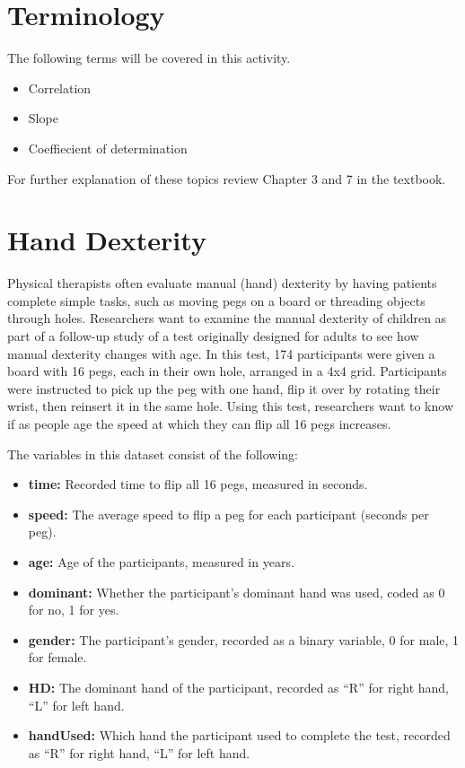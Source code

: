 \documentclass[
]{report}
\begin{document}
\hypertarget{terminology}{%
\section{Terminology}\label{terminology}}

The following terms will be covered in this activity.

\begin{itemize}
\item
  Correlation
\item
  Slope
\item
  Coeffiecient of determination
\end{itemize}

For further explanation of these topics review Chapter 3 and 7 in the textbook.

\hypertarget{hand-dexterity}{%
\section{Hand Dexterity}\label{hand-dexterity}}

Physical therapists often evaluate manual (hand) dexterity by having patients complete simple tasks, such as moving pegs on a board or threading objects through holes. Researchers want to examine the manual dexterity of children as part of a follow-up study of a test originally designed for adults to see how manual dexterity changes with age. In this test, 174 participants were given a board with 16 pegs, each in their own hole, arranged in a 4x4 grid. Participants were instructed to pick up the peg with one hand, flip it over by rotating their wrist, then reinsert it in the same hole. Using this test, researchers want to know if as people age the speed at which they can flip all 16 pegs increases.

The variables in this dataset consist of the following:

\begin{itemize}
\item
  \textbf{time:} Recorded time to flip all 16 pegs, measured in seconds.
\item
  \textbf{speed:} The average speed to flip a peg for each participant (seconds per peg).
\item
  \textbf{age:} Age of the participants, measured in years.
\item
  \textbf{dominant:} Whether the participant's dominant hand was used, coded as 0 for no, 1 for yes.
\item
  \textbf{gender:} The participant's gender, recorded as a binary variable, 0 for male, 1 for female.
\item
  \textbf{HD:} The dominant hand of the participant, recorded as ``R'' for right hand, ``L'' for left hand.
\item
  \textbf{handUsed:} Which hand the participant used to complete the test, recorded as ``R'' for right hand, ``L'' for left hand.
\end{itemize}
\end{document}
